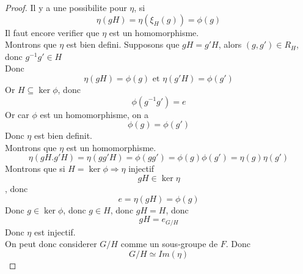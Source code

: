 \documentclass[../main.tex]{subfiles}
\begin{document}
\begin{proof}
Il y a une possibilite pour $\eta$, si
\[ 
	\eta( gH)  = \eta( \xi_H ( g) ) = \phi( g) 
\]
Il faut encore verifier que $\eta $ est un homomorphisme.\\
Montrons que $\eta$ est bien defini.
Supposons que $gH= g'H$, alors $( g,g') \in R_H$, donc $g^{-1}g'\in H$ \\
Donc 
\[ 
	\eta ( gH) = \phi( g) \text{ et } \eta( g'H) = \phi( g') 
\]
Or $H \subseteq \ker \phi$, donc
\[ 
	\phi( g^{-1}g') = e 
\]
Or car $\phi$ est un homomorphisme, on a 
\[ 
	\phi( g) = \phi( g') 
\]
Donc $\eta$ est bien definit.\\
Montrons que $\eta$ est un homomorphisme.
\[ 
	\eta( gH .g'H) = \eta( gg'H) = \phi( gg') = \phi( g) \phi( g') = \eta( g) \eta( g') 
\]
Montrons que si $H = \ker \phi \Rightarrow \eta$ injectif\\
\[ 
gH \in \ker \eta
\]
, donc
\[ 
	e= \eta( gH) = \phi( g) 
\]
Donc $g \in \ker \phi$, donc $g \in H$, donc $gH = H$, donc 
\[ 
gH = e_{G /H} 
\]
Donc $\eta$ est injectif.\\
On peut donc considerer $G /H$ comme un sous-groupe de $F$.
Donc
\[ 
	G / H \simeq Im( \eta) 
\]
\end{proof}
\end{document}
